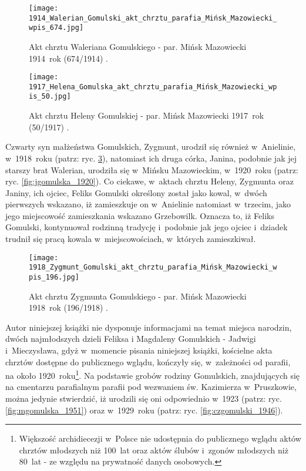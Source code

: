 \begin{figure}[!ht]
    \vspace*{0.5cm}
    \centering \texttt{[image: 
        1914\_Walerian\_Gomulski\_akt\_chrztu\_parafia\_Mińsk\_Mazowiecki\_wpis\_674.jpg]}
    \captionsetup{format=hang}
    \caption{Akt chrztu Waleriana Gomulskiego - par. Mińsk Mazowiecki 
    1914~rok (674/1914) 
    \cite{par_minsk2}.}
    \label{fig:wgomulski_1914}
\end{figure}

\begin{figure}[!ht]
    \vspace*{0.5cm}
    \centering \texttt{[image: 
        1917\_Helena\_Gomulska\_akt\_chrztu\_parafia\_Mińsk\_Mazowiecki\_wpis\_50.jpg]}
    \captionsetup{format=hang}
    \caption{Akt chrztu Heleny Gomulskiej - par. Mińsk Mazowiecki 
    1917~rok (50/1917) 
    \cite{par_minsk2}.}
    \label{fig:hgomulska_1917}
\end{figure}

Czwarty syn małżeństwa Gomulskich, Zygmunt, urodził się również 
w~Anielinie, w~1918~roku (patrz: ryc. \ref{fig:zgomulski_1918}), natomiast 
ich druga córka, Janina, podobnie jak jej starszy brat Walerian, urodziła się 
w~Mińsku Mazowieckim, w~1920~roku (patrz: ryc. \ref{fig:jgomulska_1920}). Co 
ciekawe, w~aktach chrztu Heleny, Zygmunta oraz Janiny, ich ojciec, Feliks 
Gomulski określony został jako kowal, w~dwóch pierwszych wskazano, iż 
zamieszkuje on w~Anielinie natomiast w~trzecim, jako jego miejscowość 
zamieszkania wskazano Grzebowilk. Oznacza to, iż Feliks Gomulski, kontynuował 
rodzinną tradycję i~podobnie jak jego ojciec i~dziadek trudnił się pracą 
kowala w~miejscowościach, w~których zamieszkiwał.

\begin{figure}[!ht]
    \vspace*{0.5cm}
    \centering \texttt{[image: 
        1918\_Zygmunt\_Gomulski\_akt\_chrztu\_parafia\_Mińsk\_Mazowiecki\_wpis\_196.jpg]}
    \captionsetup{format=hang}
    \caption{Akt chrztu Zygmunta Gomulskiego - par. Mińsk Mazowiecki 
    1918~rok (196/1918) 
    \cite{par_minsk2}.}
    \label{fig:zgomulski_1918}
\end{figure}

Autor niniejszej książki nie dysponuje informacjami na temat miejsca narodzin, 
dwóch najmłodszych dzieli Feliksa i Magdaleny Gomulskich - Jadwigi 
i~Mieczysława, gdyż w~momencie pisania niniejszej książki, kościelne akta 
chrztów dostępne do publicznego wglądu, kończyły się, w~zależności od 
parafii, na około 1920~roku\footnote{Większość archidiecezji w~Polsce nie 
udostępnia do publicznego wglądu aktów chrztów młodszych niż 100~lat oraz 
aktów ślubów i~zgonów młodszych niż 80~lat - ze względu na prywatność danych 
osobowych.}. Na podstawie grobów rodziny Gomulskich, znajdujących się na 
cmentarzu parafialnym parafii pod wezwaniem św. Kazimierza w~Pruszkowie, 
można jedynie stwierdzić, iż urodzili się oni odpowiednio w~1923 (patrz: ryc. 
\ref{fig:mgomulska_1951}) oraz w~1929~roku (patrz: ryc. 
\ref{fig:czgomulski_1946}).

